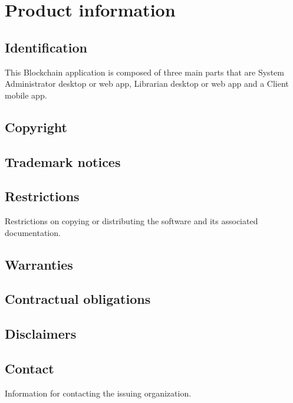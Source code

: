 \chapter{Product information}
\vspace{-6em}


\section{Identification}
This Blockchain application is composed of three main parts that are System Administrator desktop or web app, Librarian desktop or web app and a Client mobile app.    

\section{Copyright}

\section{Trademark notices}

\section{Restrictions}
Restrictions on copying or distributing the software and its associated
documentation.

\section{Warranties}

\section{Contractual obligations}

\section{Disclaimers}

\section{Contact}
Information for contacting the issuing organization.